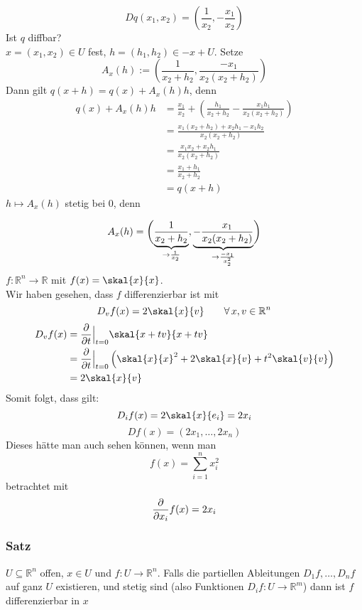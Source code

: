 \[
	Dq(x_1,x_2)= \left( \frac{1}{x_2}, -\frac{x_1}{x_2} \right)
\]
Ist $q$ diffbar? \\
$x=(x_1,x_2) \in U$ fest, $h=(h_1,h_2) \in -x+U$. Setze
\[
	A_x(h):= \left( \frac{1}{x_2+h_2} , \frac{-x_1}{x_2(x_2+h_2)}  \right)
\]
Dann gilt $q(x+h)=q(x)+A_x(h)h$, denn
\begin{align*}
	q(x)+A_x(h)h &= \frac{x_1}{x_2}+ \left( \frac{h_1}{x_2+h_2}-\frac{x_1h_1}{x_2(x_2+h_2)}  \right) \\
	&= \frac{x_1(x_2+h_2)+x_2h_1-x_1h_2}{x_2(x_2+h_2)} \\
	&= \frac{x_1x_2 + x_2h_1}{x_2(x_2+h_2)} \\
	&= \frac{x_1+h_1}{x_2+h_2} \\
	&= q(x+h)
\end{align*}
$h \mapsto A_x(h)$ stetig bei 0, denn

\[
	A_x(h)= \enbrace[\bigg]{ \underset{\to \frac{1}{x_2}}{\underbrace{\frac{1}{x_2+h_2}}} , \underset{\to \frac{-x_1}{x_2^2}}{\underbrace{-\frac{x_1}{x_2(x_2+h_2)}}}  }
\]
$f: \mathbb{R}^n \to \mathbb{R}$ mit $f(x)=\skal{x}{x}$. \\
Wir haben gesehen, dass $f$ differenzierbar ist mit 
\[
	D_vf(x)= 2 \skal{x}{v} \qquad \forall\, x,v \in \mathbb{R}^n
\] 
\begin{align*}
	D_vf(x) &= \diff{}{t}  \Big|_{t=0}\skal{x+tv}{x+tv} \\
			&= \diff{}{t}  \Big|_{t=0} \left( \skal{x}{x}^2 + 2 \skal{x}{v} + t^2 \skal{v}{v} \right) \\
			&= 2 \skal{x}{v}
\end{align*}
Somit folgt, dass gilt: \[
	D_if(x)=2 \skal{x}{e_i} = 2 x_i
\]
\[
	Df(x)=(2x_1, \dots, 2x_n)
\]
Dieses hätte man auch sehen können, wenn man 
\[
	f(x)= \sum^{n}_{i=1}x_i^2
\]
betrachtet mit 
\[
	\diff{}{x_i}f(x)=2x_i
\]

\subsubsection{Satz} %
\label{ssub:satz}
$U \subseteq \mathbb{R}^n$ offen, $x \in U$ und $f:U \to \mathbb{R}^n$. Falls die partiellen Ableitungen $D_1f, \dots , D_nf$ auf ganz $U$ existieren, und stetig 
sind (also Funktionen $D_if: U \to \mathbb{R}^m$) dann ist $f$ differenzierbar in $x$

